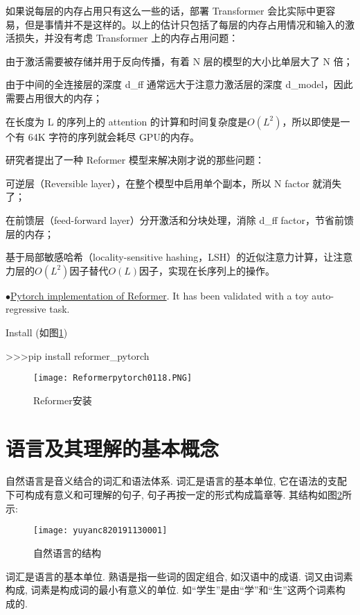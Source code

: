 如果说每层的内存占用只有这么一些的话，部署 Transformer 会比实际中更容易，但是事情并不是这样的。以上的估计只包括了每层的内存占用情况和输入的激活损失，并没有考虑 Transformer 上的内存占用问题：


由于激活需要被存储并用于反向传播，有着 N 层的模型的大小比单层大了 N 倍；

由于中间的全连接层的深度 d\_ff 通常远大于注意力激活层的深度 d\_model，因此需要占用很大的内存；

在长度为 L 的序列上的 attention 的计算和时间复杂度是$O(L^2)$，所以即使是一个有 64K 字符的序列就会耗尽 GPU的内存。

研究者提出了一种 Reformer 模型来解决刚才说的那些问题：

可逆层（Reversible layer），在整个模型中启用单个副本，所以 N factor 就消失了；

在前馈层（feed-forward layer）分开激活和分块处理，消除 d\_ff factor，节省前馈层的内存；

基于局部敏感哈希（locality-sensitive hashing，LSH）的近似注意力计算，让注意力层的$ O(L^2)$因子替代$ O(L)$因子，实现在长序列上的操作。

$\bullet$\href{https://openreview.net/pdf?id=rkgNKkHtvB}{Pytorch implementation of Reformer}. It has been validated with a toy auto-regressive task.

Install (如图\ref{PycharmPytorchReformer})

>>>pip install reformer\_pytorch
\begin{figure}[htbp]
\centering
\texttt{[image: Reformerpytorch0118.PNG]}
\caption{Reformer安装}
\label{PycharmPytorchReformer}
\end{figure}
\section{语言及其理解的基本概念}
自然语言是音义结合的词汇和语法体系. 词汇是语言的基本单位, 它在语法的支配下可构成有意义和可理解的句子, 句子再按一定的形式构成篇章等. 其结构如图\ref{AI32fig3001}所示:
\begin{figure}[H]
\centering
\texttt{[image: yuyanc820191130001]}
\caption{自然语言的结构}
\label{AI32fig3001}
\end{figure}

词汇是语言的基本单位. 熟语是指一些词的固定组合, 如汉语中的成语. 词又由词素构成, 词素是构成词的最小有意义的单位. 如“学生”是由“学”和“生”这两个词素构成的.

